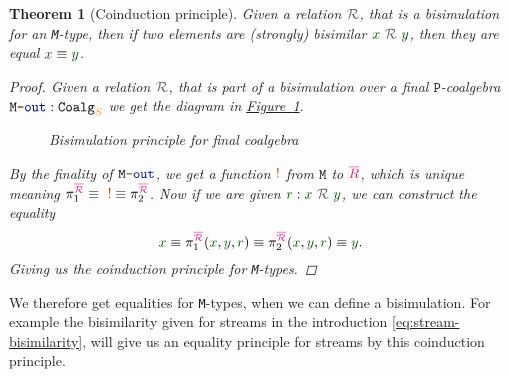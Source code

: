 \documentclass[twoside,11pt,openright]{report}
\theoremstyle{plain} %
\newtheorem{thm}{Theorem}[section]
\theoremstyle{definition}
\theoremstyle{remark}
\newcommand*{\figref}[1]{\hyperref[fig:#1]{Figure~\ref*{fig:#1}}}
\newcommand*{\term}[1]{\textcolor{green!30!black}{#1}} %
\newcommand*{\type}[1]{\textcolor{magenta!90!black}{#1}}
\newcommand*{\container}[1]{\textcolor{orange}{#1}}
\newcommand*{\coalg}[2]{#1\texttt{-}#2}
\newcommand*{\relation}[1]{\textcolor{gray!75!black}{\ensuremath{\mathtt{#1}}}}
\newcommand*{\constant}[1]{\textcolor{orange!60!black}{\ensuremath{\mathtt{#1}}}}
\newcommand*{\function}[1]{\textcolor{blue!60!black}{\ensuremath{\mathtt{#1}}}}
\newcommand*{\typeformer}[1]{\ensuremath{\mathtt{#1}}}
\newcommand*{\functor}[1]{\ensuremath{\mathbf{\mathtt{#1}}}}
\begin{document}
\begin{thm}[Coinduction principle]
  \label{thm:M-coinduction-principle}
  Given a relation \(\relation{\mathcal{R}}\), that is a bisimulation for an \texttt{M}-type, then if two elements are (strongly) bisimilar \(\term{x}~\relation{\mathcal{R}}~\term{y}\), then they are equal \(\term{x} \equiv \term{y}\).  
  \begin{proof}
    Given a relation \(\relation{\mathcal{R}}\), that is part of a bisimulation over a final \(\functor{P}\)-coalgebra \(\coalg{\typeformer{M}}{\function{out}}:\mathtt{Coalg}_{\container{S}}\) we get the diagram in \figref{final-coalgebra-coinduction}.
    \begin{figure}[h]
      \centering
      \caption{Bisimulation principle for final coalgebra}
      \label{fig:final-coalgebra-coinduction}
    \end{figure}
    By the finality of \(\coalg{\typeformer{M}}{\function{out}}\), we get a function \(\constant{!}\) from \(\typeformer{M}\) to \(\type{\overline{R}}\), which is unique meaning \(\pi_1^{\type{\overline{\mathcal{R}}}} \equiv ~\constant{!} \equiv \pi_2^{\type{\overline{\mathcal{R}}}}\). Now if we are given \(\term{r} : \term{x}~\relation{\mathcal{R}}~\term{y}\), we can construct the equality
    \begin{equation}
      \term{x} \equiv \pi_1^{\type{\overline{\mathcal{R}}}} (\term{x}, \term{y}, \term{r}) \equiv \pi_2^{\type{\overline{\mathcal{R}}}} (\term{x}, \term{y}, \term{r}) \equiv \term{y}.
    \end{equation}
    Giving us the coinduction principle for \texttt{M}-types.
  \end{proof}
\end{thm}
\noindent We therefore get equalities for \texttt{M}-types, when we can define a bisimulation. For example the bisimilarity given for streams in the introduction \eqref{eq:stream-bisimilarity}, will give us an equality principle for streams by this coinduction principle.

\end{document}
